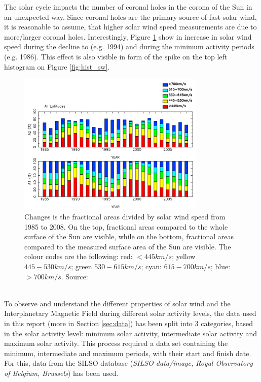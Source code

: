 \documentclass[11pt]{article}
\begin{document}
        The solar cycle impacts the number of coronal holes in the corona of the Sun in an unexpected way. Since coronal holes are the primary source of fast solar wind, it is reasonable to assume, that higher solar wind speed measurements are due to more/larger coronal holes. Interestingly, Figure \ref{fig:sw_speeds} show in increase in solar wind speed during the decline to (e.g. 1994) and during the minimum activity periods (e.g. 1986)\cite{2010tokumaru}. This effect is also visible in form of the spike on the top left histogram on Figure \ref{fig:hist_sw}.\\
        \begin{figure}[t!]
            \centering
            \includegraphics[width=0.8\textwidth]{fig_theory/sw_speed_distribution.PNG}
            \caption{Changes is the fractional areas divided by solar wind speed from 1985 to 2008. On the top, fractional areas compared to the whole surface of the Sun are visible, while on the bottom, fractional areas compared to the measured surface area of the Sun are visible. The colour codes are the following: red: $<445km/s$; yellow $445-530km/s$; green $530-615km/s$; cyan: $615-700km/s$; blue: $>700km/s$. Source: \cite{2010tokumaru}}
            \label{fig:sw_speeds}
        \end{figure}\\
        To observe and understand the different properties of solar wind and the Interplanetary Magnetic Field during different solar activity levels, the data used in this report (more in Section \ref{sec:data}) has been split into 3 categories, based in the solar activity level: minimum solar activity, intermediate solar activity and maximum solar activity. This process required a data set containing the minimum, intermediate and maximum periods, with their start and finish date. For this, data from the SILSO database (\textit{SILSO data/image, Royal Observatory of Belgium, Brussels}) has been used.\\ \\
\end{document}
